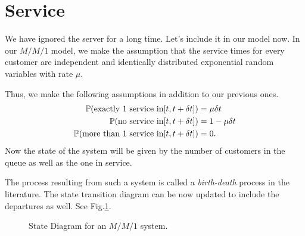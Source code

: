 \documentclass[11pt, a4paper]{report}
\begin{document}
\section{Service}
We have ignored the server for a long time. Let's include it in our model now. In our $M/M/1$ model, we make the assumption that the service times for every customer are independent and identically distributed exponential random variables with rate $\mu$.

Thus, we make the following assumptions in addition to our previous ones.
\begin{subequations}
    \begin{align}
        {\mathbb{P}}(\text{exactly 1 service in} [t, t+\delta t]) &= \mu \delta t \\
        {\mathbb{P}}(\text{no service in} [t, t+\delta t]) &= 1 - \mu \delta t  \\
        {\mathbb{P}}(\text{more than 1 service in} [t, t+\delta t]) &= 0.  
    \end{align}    
    \label{eq:assumDep}
\end{subequations}
Now the state of the system will be given by the number of customers in the queue as well as the one in service. 

The process resulting from such a system is called a \emph{birth-death} process in the literature\cite{RobertazziQ, myReference}. The state transition diagram can be now updated to include the departures as well. See Fig.\ref{fig:mm1_std}. 
\begin{figure}
    \centering
    
    \caption{State Diagram for an $M/M/1$ system.}
    \label{fig:mm1_std}
\end{figure}
\end{document}
